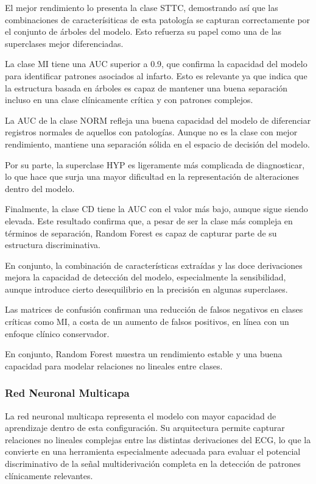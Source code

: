 \documentclass[12pt,a4paper,twoside]{book}
\begin{document}
El mejor rendimiento lo presenta la clase STTC, demostrando así que las combinaciones de caracterísiticas de esta patología se capturan correctamente por el conjunto de árboles del modelo.
Esto refuerza su papel como una de las superclases mejor diferenciadas.

La clase MI tiene una AUC superior a 0.9, que confirma la capacidad del modelo para identificar patrones asociados al infarto.
Esto es relevante ya que indica que la estructura basada en árboles es capaz de mantener una buena separación incluso en una clase clínicamente crítica y con patrones complejos.

La AUC de la clase NORM refleja una buena capacidad del modelo de diferenciar registros normales de aquellos con patologías.
Aunque no es la clase con mejor rendimiento, mantiene una separación sólida en el espacio de decisión del modelo.

Por su parte, la superclase HYP es ligeramente más complicada de diagnosticar, lo que hace que surja una mayor dificultad en la representación de alteraciones dentro del modelo.

Finalmente, la clase CD tiene la AUC con el valor más bajo, aunque sigue siendo elevada.
Este resultado confirma que, a pesar de ser la clase más compleja en términos de separación, Random Forest es capaz de capturar parte de su estructura discriminativa.

\vspace{0.5cm}

En conjunto, la combinación de características extraídas y las doce derivaciones mejora la capacidad de detección del modelo, especialmente la sensibilidad, aunque introduce cierto desequilibrio en la precisión en algunas superclases.

Las matrices de confusión confirman una reducción de falsos negativos en clases críticas como MI, a costa de un aumento de falsos positivos, en línea con un enfoque clínico conservador.

En conjunto, Random Forest muestra un rendimiento estable y una buena capacidad para modelar relaciones no lineales entre clases.

\subsubsection*{Red Neuronal Multicapa}

La red neuronal multicapa representa el modelo con mayor capacidad de aprendizaje dentro de esta configuración. 
Su arquitectura permite capturar relaciones no lineales complejas entre las distintas derivaciones del ECG, lo que la convierte en una herramienta especialmente adecuada para evaluar el potencial discriminativo de la señal multiderivación completa en la detección de patrones clínicamente relevantes.
\end{document}
